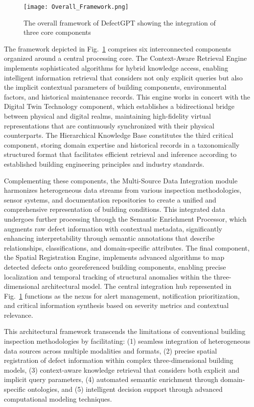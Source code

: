 \documentclass[a4paper,fleqn]{cas-sc}
\begin{document}
\begin{figure}
\centering
\texttt{[image: Overall\_Framework.png]}
\caption{The overall framework of DefectGPT showing the integration of three core components}
\label{fig:framework}
\end{figure}


The framework depicted in Fig.~\ref{fig:framework} comprises six interconnected components organized around a central processing core. The Context-Aware Retrieval Engine implements sophisticated algorithms for hybrid knowledge access, enabling intelligent information retrieval that considers not only explicit queries but also the implicit contextual parameters of building components, environmental factors, and historical maintenance records. This engine works in concert with the Digital Twin Technology component, which establishes a bidirectional bridge between physical and digital realms, maintaining high-fidelity virtual representations that are continuously synchronized with their physical counterparts. The Hierarchical Knowledge Base constitutes the third critical component, storing domain expertise and historical records in a taxonomically structured format that facilitates efficient retrieval and inference according to established building engineering principles and industry standards.

Complementing these components, the Multi-Source Data Integration module harmonizes heterogeneous data streams from various inspection methodologies, sensor systems, and documentation repositories to create a unified and comprehensive representation of building conditions. This integrated data undergoes further processing through the Semantic Enrichment Processor, which augments raw defect information with contextual metadata, significantly enhancing interpretability through semantic annotations that describe relationships, classifications, and domain-specific attributes. The final component, the Spatial Registration Engine, implements advanced algorithms to map detected defects onto georeferenced building components, enabling precise localization and temporal tracking of structural anomalies within the three-dimensional architectural model. The central integration hub represented in Fig.~\ref{fig:framework} functions as the nexus for alert management, notification prioritization, and critical information synthesis based on severity metrics and contextual relevance.

This architectural framework transcends the limitations of conventional building inspection methodologies by facilitating: (1) seamless integration of heterogeneous data sources across multiple modalities and formats, (2) precise spatial registration of defect information within complex three-dimensional building models, (3) context-aware knowledge retrieval that considers both explicit and implicit query parameters, (4) automated semantic enrichment through domain-specific ontologies, and (5) intelligent decision support through advanced computational modeling techniques. 
\end{document}
